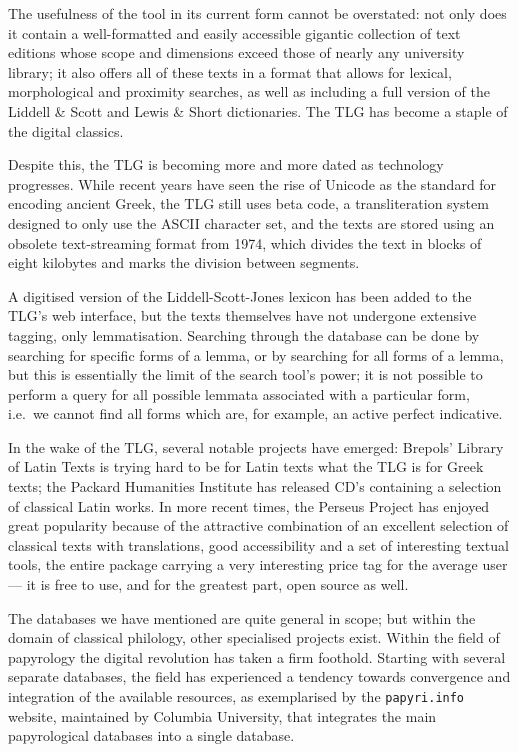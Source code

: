The usefulness of the tool in its current form cannot be overstated:
not only does it contain a well-formatted and easily accessible
gigantic collection of text editions whose scope and dimensions exceed
those of nearly any university library; it also offers all of these
texts in a format that allows for lexical, morphological and proximity
searches, as well as including a full version of the Liddell \& Scott
and Lewis \& Short dictionaries. The TLG has become a staple of the
digital classics.

Despite this, the TLG is becoming more and more dated as technology
progresses.  While recent years have seen the rise of Unicode as the
standard for encoding ancient Greek, the TLG still uses beta code, a
transliteration system designed to only use the ASCII character set,
and the texts are stored using an obsolete text-streaming format from
1974, which divides the text in blocks of eight kilobytes and marks
the division between segments.

A digitised version of the Liddell-Scott-Jones lexicon has been added
to the TLG's web interface, but the texts themselves have not
undergone extensive tagging, only lemmatisation.  Searching through
the database can be done by searching for specific forms of a lemma,
or by searching for all forms of a lemma, but this is essentially the
limit of the search tool's power; it is not possible to perform a
query for all possible lemmata associated with a particular form,
i.e.\ we cannot find all forms which are, for example, an active
perfect indicative.

In the wake of the TLG, several notable projects have emerged:
Brepols' Library of Latin Texts is trying hard to be for Latin texts
what the TLG is for Greek texts; the Packard Humanities Institute has
released CD's containing a selection of classical Latin works. In more
recent times, the Perseus Project has enjoyed great popularity because
of the attractive combination of an excellent selection of classical
texts with translations, good accessibility and a set of interesting
textual tools, the entire package carrying a very interesting price
tag for the average user — it is free to use, and for the greatest
part, open source as well.

The databases we have mentioned are quite general in scope; but within
the domain of classical philology, other specialised projects
exist. Within the field of papyrology the digital revolution has taken
a firm foothold. Starting with several separate databases, the field
has experienced a tendency towards convergence and integration of the
available resources, as exemplarised by the \texttt{papyri.info} website,
maintained by Columbia University, that integrates the main
papyrological databases into a single database.

